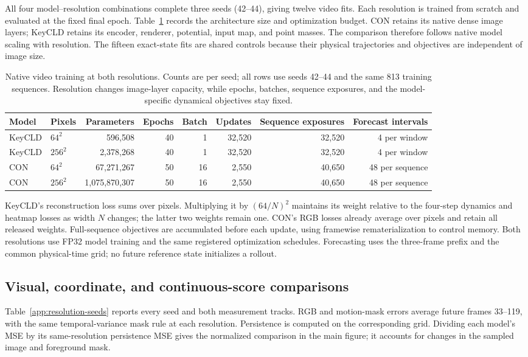 \documentclass[10pt,twocolumn,letterpaper]{article}
\begin{document}
All four model--resolution combinations complete three seeds (42--44), giving twelve video fits. Each resolution is trained from scratch and evaluated at the fixed final epoch. Table~\ref{app:resolution-budget} records the architecture size and optimization budget. CON retains its native dense image layers; KeyCLD retains its encoder, renderer, potential, input map, and point masses. The comparison therefore follows native model scaling with resolution. The fifteen exact-state fits are shared controls because their physical trajectories and objectives are independent of image size.

\begin{table}[t]
\caption{Native video training at both resolutions. Counts are per seed; all rows use seeds 42--44 and the same 813 training sequences. Resolution changes image-layer capacity, while epochs, batches, sequence exposures, and the model-specific dynamical objectives stay fixed.}
\label{app:resolution-budget}
\centering\small
\begin{tabular}{llrrrrrr}
\toprule
Model & Pixels & Parameters & Epochs & Batch & Updates & Sequence exposures & Forecast intervals\\
\midrule
KeyCLD & $64^2$ & 596,508 & 40 & 1 & 32,520 & 32,520 & 4 per window\\
KeyCLD & $256^2$ & 2,378,268 & 40 & 1 & 32,520 & 32,520 & 4 per window\\
CON & $64^2$ & 67,271,267 & 50 & 16 & 2,550 & 40,650 & 48 per sequence\\
CON & $256^2$ & 1,075,870,307 & 50 & 16 & 2,550 & 40,650 & 48 per sequence\\
\bottomrule
\end{tabular}
\end{table}

KeyCLD's reconstruction loss sums over pixels. Multiplying it by $(64/N)^2$ maintains its weight relative to the four-step dynamics and heatmap losses as width $N$ changes; the latter two weights remain one. CON's RGB losses already average over pixels and retain all released weights. Full-sequence objectives are accumulated before each update, using framewise rematerialization to control memory. Both resolutions use FP32 model training and the same registered optimization schedules. Forecasting uses the three-frame prefix and the common physical-time grid; no future reference state initializes a rollout.

\subsection{Visual, coordinate, and continuous-score comparisons}
Table~\ref{app:resolution-seeds} reports every seed and both measurement tracks. RGB and motion-mask errors average future frames 33--119, with the same temporal-variance mask rule at each resolution. Persistence is computed on the corresponding grid. Dividing each model's MSE by its same-resolution persistence MSE gives the normalized comparison in the main figure; it accounts for changes in the sampled image and foreground mask.
\end{document}
